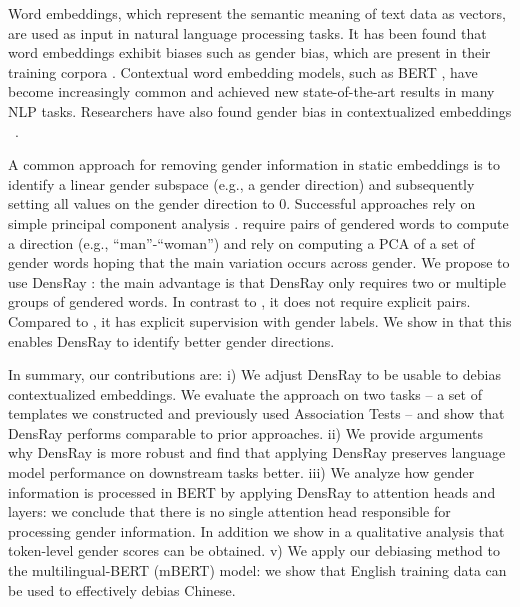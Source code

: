 Word embeddings, which represent the semantic meaning of
text data as vectors, are used as input in natural language
processing tasks. It has been found that word embeddings
exhibit biases such as gender bias, which are present in their training
corpora \cite{bolukbasi2016man,caliskan2017semantics,garg2018word}. Contextual word
embedding models, such as BERT \cite{devlin2018bert}, have
become increasingly common and achieved new state-of-the-art
results in many NLP tasks. Researchers have also found
gender bias in contextualized
embeddings ~\cite{zhao2019gender,may2019measuring}.

A common approach for removing gender information in static
embeddings is to identify a linear gender subspace (e.g., a
gender direction) and subsequently setting all values on the
gender direction to 0. Successful approaches rely on simple
principal component
analysis \cite{bolukbasi2016man,mu2018all}. 
require pairs of gendered words to compute a direction
(e.g., ``man''-``woman'') and  rely on
computing a PCA of a set of gender words hoping that the
main variation occurs across gender. We propose to use
DensRay \cite{dufter2019analytical}: the main advantage is
that DensRay only requires two or multiple groups of
gendered words. In contrast to \cite{bolukbasi2016man}, it
does not require explicit pairs. Compared
to \cite{mu2018all}, it has explicit supervision with gender
labels. We show in  that this enables
DensRay to identify better gender directions.

In summary, our contributions are: 
i) We adjust DensRay to be usable to debias contextualized embeddings.
We evaluate the approach on two tasks -- a set of templates
we constructed and previously used Association Tests -- and show that DensRay performs comparable to prior approaches. 
ii) We provide arguments why DensRay is more robust and find that applying DensRay preserves language model performance on downstream tasks better.
iii) We analyze how gender information is processed in BERT by applying DensRay to attention heads and layers: we conclude that there is no single attention head responsible for processing gender information. In addition we show in a qualitative analysis that token-level gender scores can be obtained. 
v) We apply our debiasing method to the multilingual-BERT (mBERT) model: we show that English training data can be used to effectively debias Chinese.

